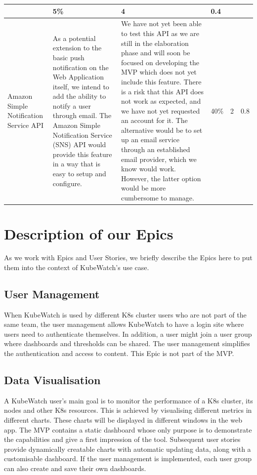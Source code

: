 \begin{longtable}[h!]{p{2.2cm} | p{4cm} | p{4cm} | p{1.5cm} | p{1.5cm} | p{1.5cm}}
            & 5\% & 4 & 0.4 \\ \hline
        Amazon Simple Notification Service API
            & As a potential extension to the basic push notification on the Web Application itself, we intend to add the ability to notify a user through email. The Amazon Simple Notification Service (SNS) API would provide this feature in a way that is easy to setup and configure.
            & We have not yet been able to test this API as we are still in the elaboration phase and will soon be focused on developing the MVP which does not yet include this feature. There is a risk that this API does not work as expected, and we have not yet requested an account for it. The alternative would be to set up an email service through an established email provider, which we know would work. However, the latter option would be more cumbersome to manage.
            & 40\% & 2 & 0.8 \\ \hline
\end{longtable}


\section{Description of our Epics}

As we work with Epics and User Stories, we briefly describe the Epics here to put them into the context of KubeWatch's use case.

\subsection{User Management}
When KubeWatch is used by different K8s cluster users who are not part of the same team, the user management allows KubeWatch to have a login site where users need to authenticate themselves. In addition, a user might join a user group where dashboards and thresholds can be shared. The user management simplifies the authentication and access to content. This Epic is not part of the MVP.

\subsection{Data Visualisation}
A KubeWatch user's main goal is to monitor the performance of a K8s cluster, its nodes and other K8s resources. This is achieved by visualising different metrics in different charts. These charts will be displayed in different windows in the web app. The MVP contains a static dashboard whose only purpose is to demonstrate the capabilities and give a first impression of the tool. Subsequent user stories provide dynamically creatable charts with automatic updating data, along with a customisable dashboard. If the user management is implemented, each user group can also create and save their own dashboards.

